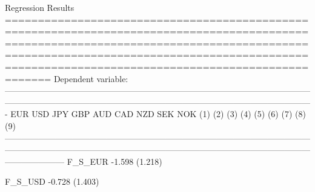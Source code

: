 Regression Results
=============================================================================================================================================================================================================================================
                                                                                                                       Dependent variable:                                                                                                   
                    -------------------------------------------------------------------------------------------------------------------------------------------------------------------------------------------------------------------------
                              EUR                     USD                     JPY                     GBP                     AUD                      CAD                      NZD                     SEK                     NOK          
                              (1)                     (2)                     (3)                     (4)                     (5)                      (6)                      (7)                     (8)                     (9)          
---------------------------------------------------------------------------------------------------------------------------------------------------------------------------------------------------------------------------------------------
F_S_EUR                     -1.598                                                                                                                                                                                                           
                            (1.218)                                                                                                                                                                                                          
                                                                                                                                                                                                                                             
F_S_USD                                             -0.728                                                                                                                                                                                   
                                                    (1.403)                                                                                                                                                                                  
                                                                                                                                                                                                                                             
